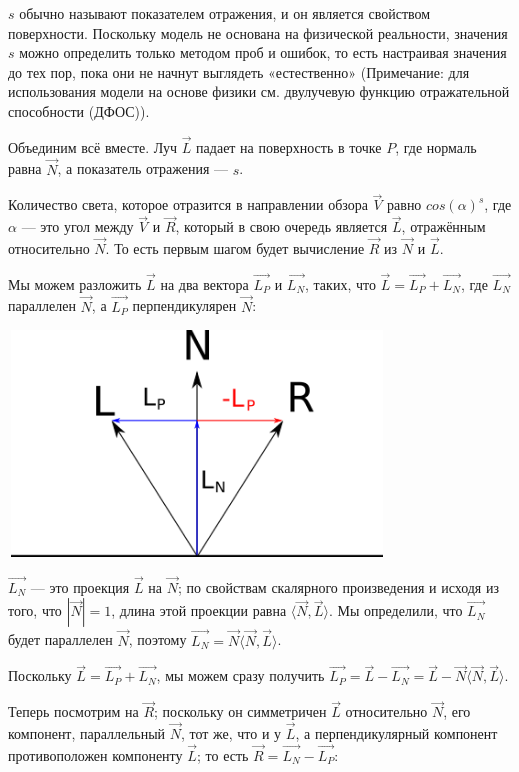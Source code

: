 $s$ обычно называют показателем отражения, и он является свойством поверхности. Поскольку модель не основана на физической реальности, значения $s$ можно определить только методом проб и ошибок, то есть настраивая значения до тех пор, пока они не начнут выглядеть «естественно» (Примечание: для использования модели на основе физики см. двулучевую функцию отражательной способности (ДФОС)).

Объединим всё вместе. Луч $\vec{L}$ падает на поверхность в точке $P$, где нормаль равна $\vec{N}$, а показатель отражения — $s$.

Количество света, которое отразится в направлении обзора $\vec{V}$ равно $cos(\alpha)^s$, где $\alpha$ — это угол между $\vec{V}$ и $\vec{R}$, который в свою очередь является $\vec{L}$, отражённым относительно $\vec{N}$. То есть первым шагом будет вычисление $\vec{R}$ из $\vec{N}$ и $\vec{L}$.

Мы можем разложить $\vec{L}$ на два вектора $\vec{L_P}$ и $\vec{L_N}$, таких, что $\vec{L} = \vec{L_P} + \vec{L_N}$, где $\vec{L_N}$ параллелен $\vec{N}$, а $\vec{L_P}$ перпендикулярен $\vec{N}$:

\includegraphics[width=10cm, height=6cm]{proections.png}

$\vec{L_N}$ — это проекция $\vec{L}$ на $\vec{N}$; по свойствам скалярного произведения и исходя из того, что $|\vec{N}| = 1$, длина этой проекции равна $\langle \vec{N}, \vec{L} \rangle$. Мы определили, что $\vec{L_N}$ будет параллелен $\vec{N}$, поэтому $\vec{L_N} = \vec{N} \langle \vec{N}, \vec{L} \rangle$.

Поскольку $\vec{L} = \vec{L_P} + \vec{L_N}$, мы можем сразу получить $\vec{L_P} = \vec{L} - \vec{L_N} = \vec{L} - \vec{N} \langle \vec{N}, \vec{L} \rangle$.

Теперь посмотрим на $\vec{R}$; поскольку он симметричен $\vec{L}$ относительно $\vec{N}$, его компонент, параллельный $\vec{N}$, тот же, что и у $\vec{L}$, а перпендикулярный компонент противоположен компоненту $\vec{L}$; то есть $\vec{R} = \vec{L_N} - \vec{L_P}$:

